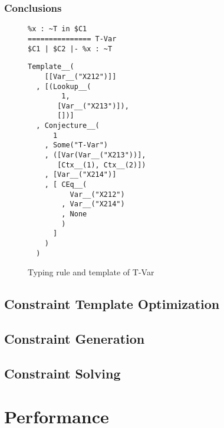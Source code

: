 \subsubsection*{Conclusions}

\begin{figure}
  \centering
  \begin{minipage}{.45\linewidth}
\begin{verbatim}
%x : ~T in $C1
=============== T-Var
$C1 | $C2 |- %x : ~T
\end{verbatim}
  \end{minipage}
  \begin{minipage}{.45\linewidth}
\begin{verbatim}
Template__(
    [[Var__("X212")]]
  , [(Lookup__(
        1,
       [Var__("X213")]),
       [])]
  , Conjecture__(
      1
    , Some("T-Var")
    , ([Var(Var__("X213"))],
       [Ctx__(1), Ctx__(2)])
    , [Var__("X214")]
    , [ CEq__(
          Var__("X212")
        , Var__("X214")
        , None
        )
      ]
    )
  )
\end{verbatim}
  \end{minipage}
  \caption{Typing rule and template of T-Var}
  \label{fig:template-example}
\end{figure}
\subsection{Constraint Template Optimization}
\label{sec:constr-templ-optim}
\subsection{Constraint Generation}
\label{sec:constr-gener}
\subsection{Constraint Solving}
\label{sec:constraint-solving}
\section{Performance}
\label{sec:performance}


